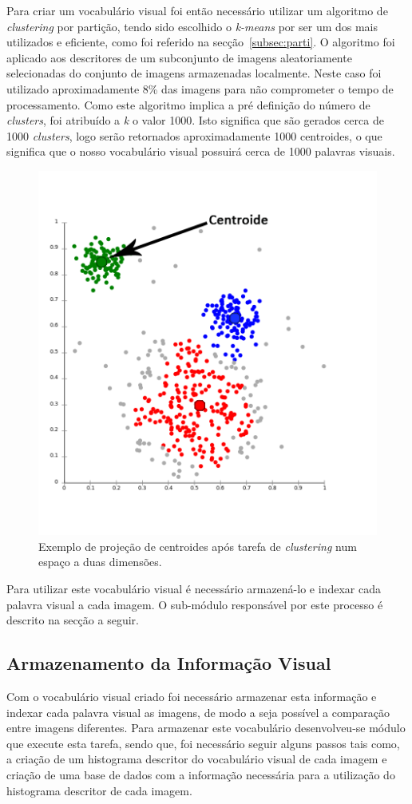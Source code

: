 Para criar um vocabulário visual foi então necessário utilizar um algoritmo de \textit{clustering} por partição, tendo sido escolhido o \textit{k-means} por ser um dos mais utilizados e eficiente, como foi referido na secção~\ref{subsec:parti}. O algoritmo foi aplicado aos descritores de um subconjunto de imagens aleatoriamente selecionadas do conjunto de imagens armazenadas localmente. Neste caso foi utilizado aproximadamente 8\% das imagens para não comprometer o tempo de processamento. Como este algoritmo implica a pré definição do número de \textit{clusters}, foi atribuído a \textit{k} o valor 1000. Isto significa que são gerados cerca de 1000 \textit{clusters}, logo serão retornados aproximadamente 1000 centroides, o que significa que o nosso vocabulário visual possuirá cerca de 1000 palavras visuais.

\begin{figure}
\centering
\includegraphics[width=0.6\linewidth]{./figures/centroides}
\caption{Exemplo de projeção de centroides após tarefa de \textit{clustering} num espaço a duas dimensões.}
\label{fig:centroides}
\end{figure}

Para utilizar este vocabulário visual é necessário armazená-lo e indexar cada palavra visual a cada imagem. O sub-módulo responsável por este processo é descrito na secção a seguir.

\subsection{Armazenamento da Informação Visual}

Com o vocabulário visual criado foi necessário armazenar esta informação e indexar cada palavra visual as imagens, de modo a seja possível a comparação entre imagens diferentes. Para armazenar este vocabulário desenvolveu-se módulo que execute esta tarefa, sendo que, foi necessário seguir alguns passos tais como, a criação de um histograma descritor do vocabulário visual de cada imagem e criação de uma base de dados com a informação necessária para a utilização do histograma descritor de cada imagem.

